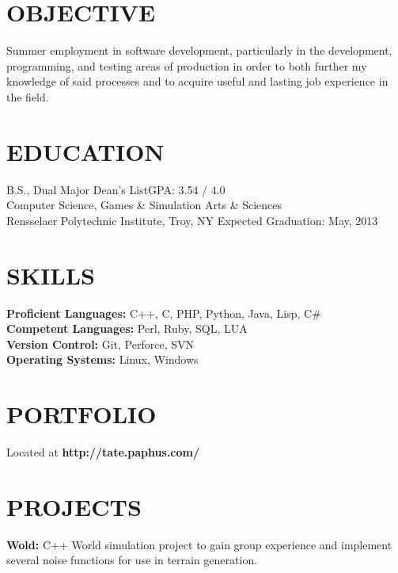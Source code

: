 \documentclass[margin,11pt]{res} %
\begin{document}

\address{{\bf Permanent Address} \\  9845 NE 27th st  \\ Bellevue, WA, 98004}
\address{ {\bf Contact Info} \\ talarsen@qwestoffice.net \\(425) 283-3847}

\begin{resume}
\section{OBJECTIVE}  
    Summer employment in software development, particularly in the development, programming, and testing areas of production in order to both further my knowledge of said processes and to acquire useful and lasting job experience in the field.

 
\section{EDUCATION}       B.S., Dual Major \hfill Dean's List\hfill GPA: 3.54 / 4.0 \\
                Computer Science, Games \& Simulation Arts \& Sciences  \\
                Rensselaer Polytechnic Institute, Troy, NY \hfill Expected Graduation: May, 2013
 
\section{SKILLS}       {\bf Proficient Languages:} C++, C, PHP, Python, Java, Lisp, C\# \\
                {\bf Competent Languages:} Perl, Ruby, SQL, LUA \\
                {\bf Version Control:} Git, Perforce, SVN \\
                {\bf Operating Systems:} Linux, Windows
 
\section{PORTFOLIO}      {Located at {\bf http://tate.paphus.com/}}

\section{PROJECTS}
                {{\bf Wold:} C++ World simulation project to gain group experience and implement several noise functions for use in terrain generation.}


\end{resume}
\end{document}
